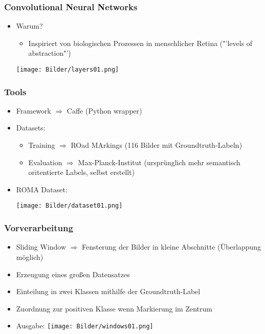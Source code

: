 \documentclass[t]{beamer}
\begin{document}
\begin{frame}
	\frametitle{Convolutional Neural Networks}
	\begin{itemize}
	\item Warum?
	\begin{itemize}
		\item Inspiriert von biologischen Prozessen in menschlicher Retina ("'levels of abstraction"')
	\end{itemize}
	\bigskip
	\hspace{2mm}
	\texttt{[image: Bilder/layers01.png]}
	\end{itemize}
\end{frame}

\begin{frame}
	\frametitle{Tools}
	\begin{itemize}
	\item Framework $\Rightarrow$ Caffe (Python wrapper)
	\item Datasets:
	\begin{itemize}
		\item Training $\Rightarrow$ ROad MArkings (116 Bilder mit Groundtruth-Labeln)
		\item Evaluation $\Rightarrow$ Max-Planck-Institut (ursprünglich mehr semantisch oritentierte Labels, selbst erstellt)
	\end{itemize}
	\item ROMA Dataset:
	\bigskip
	\begin{center}
	\texttt{[image: Bilder/dataset01.png]}	
	\end{center}	
	\end{itemize}
\end{frame}

\begin{frame}
	\frametitle{Vorverarbeitung}
	\begin{itemize}
	\item Sliding Window $\Rightarrow$ Fensterung der Bilder in kleine Abschnitte (Überlappung möglich)
	\item Erzeugung eines großen Datensatzes
	\item Einteilung in zwei Klassen mithilfe der Groundtruth-Label
	\item Zuordnung zur positiven Klasse wenn Markierung im Zentrum
	\item Ausgabe:
	\texttt{[image: Bilder/windows01.png]}
	\end{itemize}
\end{frame}
\end{document}
